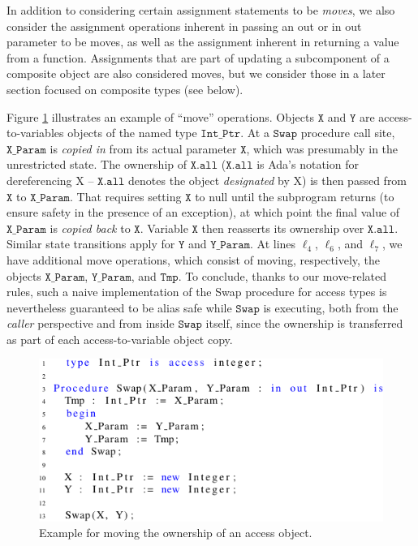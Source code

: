 \documentclass{llncs}
\newcommand\var[1]{\ensuremath{\mathtt{#1}}}
\newcommand{\keyword}[1]{\textsf{#1}}
\begin{document}
\smallskip
In addition to considering certain assignment statements to be \textit{moves}, we also consider the assignment
operations inherent in passing an \keyword{out} or \keyword{in out} parameter to be moves, as well
as the assignment inherent in returning a value from a function.
Assignments that are part of updating a subcomponent of a composite object are also considered moves, but
we consider those in a later section focused on composite types (see below).

\smallskip
Figure \ref{fig:move_ex1} illustrates an example of ``move'' operations. Objects \var{X} and \var{Y} are access-to-variables objects of the named type \var{Int\_Ptr}. At a \var{Swap} procedure call site,
\var{X\_Param} is \textit{copied in} from its actual parameter \var{X}, which was presumably in the unrestricted state. The ownership of \var{X.all} (\var{X.all} is Ada's notation for dereferencing X -- \var{X.all} denotes the object \textit{designated} by X) is then passed from \var{X} to \var{X\_Param}.
That requires setting \var{X} to null until the subprogram returns (to ensure safety in the presence of an exception), at which point the final value of \var{X\_Param} is \textit{copied back} to \var{X}.
Variable \var{X} then reasserts its ownership over \var{X.all}. Similar state transitions apply for \var{Y} and \var{Y\_Param}.  At lines $\ell_4$, $\ell_6$, and $\ell_7$,
we have additional move operations, which consist of moving, respectively, the objects \var{X\_Param}, \var{Y\_Param}, and \var{Tmp}. To conclude, thanks to our move-related rules, such a naive
implementation of the Swap procedure for access types is nevertheless guaranteed to be alias safe while \var{Swap} is executing, both from the \textit{caller} perspective and from inside \var{Swap} itself, since the ownership is transferred
as part of each access-to-variable object copy. 

\begin{figure}[htb!]
\centering
   \includegraphics[]{move_ex1}
   \caption{Example for moving the ownership of an access object.}
   \label{fig:move_ex1}
\end{figure}
 
\end{document}
